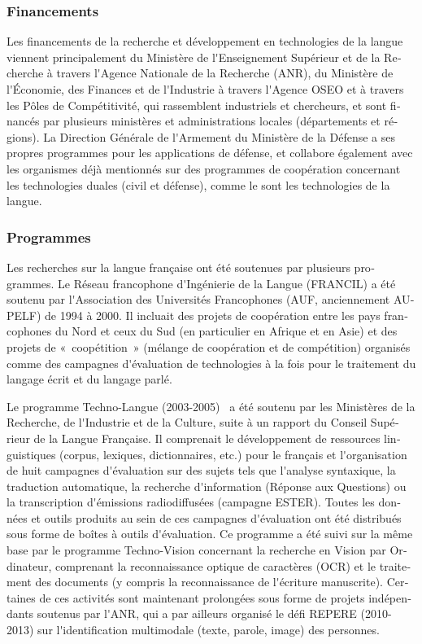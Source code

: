\begin{french}
\begin{multicols}{2}
\subsubsection{Financements}

Les financements de la recherche et développement en technologies de
la langue viennent principalement du Ministère de l{\mbox '}Enseignement
Supérieur et de la Recherche à travers l{\mbox '}Agence Nationale de la
Recherche (ANR), du Ministère de l{\mbox '}Économie, des Finances et de
l{\mbox '}Industrie à travers l{\mbox '}Agence OSEO et à travers les Pôles de
Compétitivité, qui rassemblent industriels et chercheurs, et sont
financés par plusieurs ministères et administrations locales
(départements et régions). La Direction Générale de l{\mbox '}Armement du
Ministère de la Défense a ses propres programmes pour les applications
de défense, et collabore également avec les organismes déjà mentionnés
sur des programmes de coopération concernant les technologies duales
(civil et défense), comme le sont les technologies de la langue.

\subsubsection{Programmes}

Les recherches sur la langue française ont été soutenues par plusieurs
programmes. Le Réseau francophone d{\mbox '}Ingénierie de la Langue
(FRANCIL) a été soutenu par l{\mbox '}Association des Universités
Francophones (AUF, anciennement AUPELF) de 1994 à 2000. Il incluait
des projets de coopération entre les pays francophones du Nord et ceux
du Sud (en particulier en Afrique et en Asie) et des projets de
«~coopétition~» (mélange de coopération et de compétition) organisés comme
des campagnes d{\mbox '}évaluation de technologies à la fois pour le
traitement du langage écrit et du langage parlé.

Le programme Techno-Langue (2003-2005)~\cite{technolangue} a été
soutenu par les Ministères de la Recherche, de l{\mbox '}Industrie et
de la Culture, suite à un rapport du Conseil Supérieur de la Langue
Française. Il comprenait le développement de ressources linguistiques
(corpus, lexiques, dictionnaires, etc.) pour le français et l{\mbox
  '}organisation de huit campagnes d{\mbox '}évaluation sur des sujets
tels que l{\mbox '}analyse syntaxique, la traduction automatique, la
recherche d{\mbox '}information (Réponse aux Questions) ou la
transcription d{\mbox '}émissions radiodiffusées (campagne
ESTER). Toutes les données et outils produits au sein de ces campagnes
d{\mbox '}évaluation ont été distribués sous forme de boîtes à outils
d{\mbox '}évaluation. Ce programme a été suivi sur la même base par le
programme Techno-Vision concernant la recherche en Vision par
Ordinateur, comprenant la reconnaissance optique de caractères (OCR)
et le traitement des documents (y compris la reconnaissance de l{\mbox
  '}écriture manuscrite). Certaines de ces activités sont maintenant
prolongées sous forme de projets indépendants soutenus par l{\mbox
  '}ANR, qui a par ailleurs organisé le défi REPERE (2010-2013) sur
l{\mbox '}identification multimodale (texte, parole, image) des
personnes.


\end{multicols}
\end{french}
